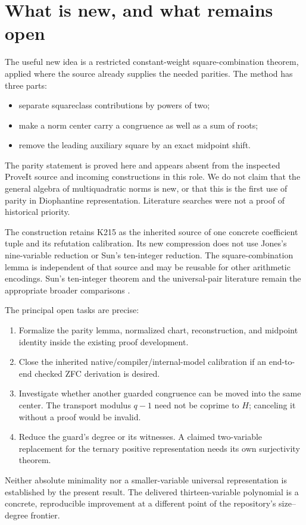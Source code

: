 \documentclass[11pt]{article}
\theoremstyle{remark}
\begin{document}
\section{What is new, and what remains open}

The useful new idea is a restricted constant-weight square-combination
theorem, applied where the source already supplies the needed parities.
The method has three parts:
\begin{itemize}
\item separate squareclass contributions by powers of two;
\item make a norm center carry a congruence as well as a sum of roots;
\item remove the leading auxiliary square by an exact midpoint shift.
\end{itemize}
The parity statement is proved here and appears absent from the inspected
ProveIt source and incoming constructions in this role.
We do not claim that the general algebra of multiquadratic norms is new,
or that this is the first use of parity in Diophantine representation.
Literature searches were not a proof of historical priority.

The construction retains K215 as the inherited source of one concrete
coefficient tuple and its refutation calibration. Its new compression
does not use Jones's nine-variable reduction or Sun's ten-integer
reduction. The square-combination lemma is independent of that source and
may be reusable for other arithmetic encodings.
Sun's ten-integer theorem and the universal-pair literature remain the
appropriate broader comparisons \cite{sun,bayer}.

The principal open tasks are precise:
\begin{enumerate}
\item Formalize the parity lemma, normalized chart, reconstruction, and
midpoint identity inside the existing proof development.
\item Close the inherited native/compiler/internal-model calibration if an
end-to-end checked ZFC derivation is desired.
\item Investigate whether another guarded congruence can be moved into the
same center. The transport modulus \(q-1\) need not be coprime to \(H\);
canceling it without a proof would be invalid.
\item Reduce the guard's degree or its witnesses. A claimed two-variable
replacement for the ternary positive representation needs its own
surjectivity theorem.
\end{enumerate}
Neither absolute minimality nor a smaller-variable universal representation
is established by the present result. The delivered thirteen-variable
polynomial is a concrete, reproducible improvement at a different point
of the repository's size--degree frontier.
\end{document}
